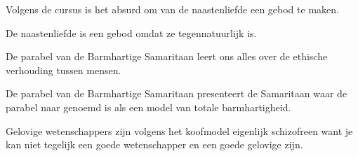 \documentclass[main.tex]{subfiles}
\begin{document}
\begin{examenvraag}
\begin{stelling}
Volgens de cursus is het absurd om van de naastenliefde een gebod te maken.
\end{stelling}

\begin{antwoord}
\end{antwoord}
\end{examenvraag}


\begin{examenvraag}
\begin{stelling}
De naastenliefde is een gebod omdat ze tegennatuurlijk is.
\end{stelling}

\begin{antwoord}
\end{antwoord}
\end{examenvraag}


\begin{examenvraag}
\begin{stelling}
De parabel van de Barmhartige Samaritaan leert ons alles over de ethische verhouding tussen mensen.
\end{stelling}

\begin{antwoord}
\end{antwoord}
\end{examenvraag}


\begin{examenvraag}
\begin{stelling}
De parabel van de Barmhartige Samaritaan presenteert de Samaritaan waar de parabel naar genoemd is als een model van totale barmhartigheid.
\end{stelling}

\begin{antwoord}
\end{antwoord}
\end{examenvraag}


\begin{examenvraag}
\begin{stelling}
Gelovige wetenschappers zijn volgens het koofmodel eigenlijk schizofreen want je kan niet tegelijk een goede wetenschapper en een goede gelovige zijn.
\end{stelling}

\begin{antwoord}
\end{antwoord}
\end{examenvraag}
\end{document}
